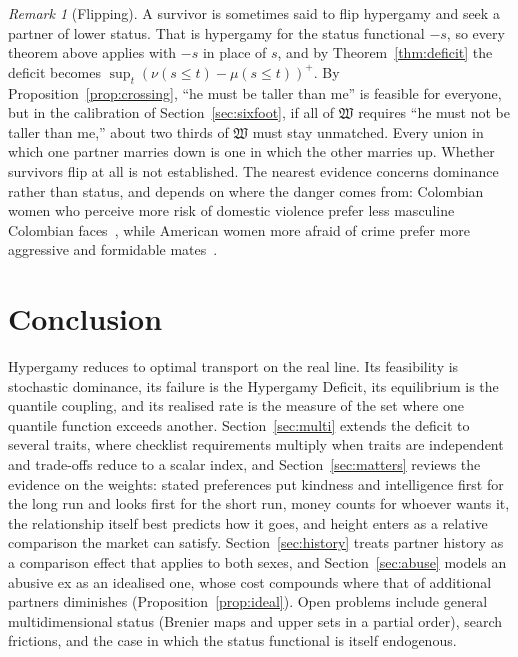 \documentclass[11pt]{article}
\let\oldsection\section
\renewcommand{\section}{\Needspace{0.25\textheight}\oldsection}
\theoremstyle{definition}
\theoremstyle{remark}
\newtheorem{remark}[theorem]{Remark}
\newcommand{\W}{\mathfrak{W}}
\begin{document}
\begin{remark}[Flipping]
  A survivor is sometimes said to flip hypergamy and seek a partner of
  lower status. That is hypergamy for the status functional $-s$, so
  every theorem above applies with $-s$ in place of $s$, and by
  Theorem~\ref{thm:deficit} the deficit becomes $\sup_t(\nu(s\le
  t)-\mu(s\le t))^+$. By Proposition~\ref{prop:crossing}, ``he must be
  taller than me'' is feasible for everyone, but in the calibration of
  Section~\ref{sec:sixfoot}, if all of $\W$ requires ``he must not be
  taller than me,'' about two thirds of $\W$ must stay unmatched. Every
  union in which one partner marries down is one in
  which the other marries up. Whether survivors flip at all is not
  established. The nearest evidence concerns dominance rather than
  status, and depends on where the danger comes from: Colombian women who
  perceive more risk of domestic violence prefer less masculine Colombian
  faces~\cite{borras}, while American women more afraid of crime prefer
  more aggressive and formidable mates~\cite{snyder}.
\end{remark}

\section{Conclusion}

Hypergamy reduces to optimal transport on the real line. Its
feasibility is stochastic dominance, its failure is the Hypergamy
Deficit, its equilibrium is the quantile coupling, and its realised
rate is the measure of the set where one quantile function exceeds
another. Section~\ref{sec:multi} extends the deficit to several traits,
where checklist requirements multiply when traits are independent and
trade-offs reduce to a scalar index, and Section~\ref{sec:matters}
reviews the evidence on the weights: stated preferences put kindness and
intelligence first for the long run and looks first for the short run,
money counts for whoever wants it, the relationship itself best predicts
how it goes, and height enters as a relative comparison the market can
satisfy. Section~\ref{sec:history} treats partner history as a
comparison effect that applies to both sexes, and
Section~\ref{sec:abuse} models an abusive ex as an idealised one, whose
cost compounds where that of additional partners diminishes
(Proposition~\ref{prop:ideal}). Open
problems include general multidimensional status (Brenier
maps and upper sets in a partial order), search frictions, and the case
in which the status functional is itself endogenous.
\end{document}
